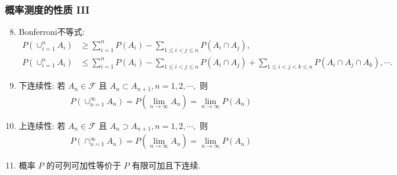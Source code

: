 \begin{frame}
	\frametitle{概率测度的性质 III}

	\begin{enumerate}[<+-|alert@+>]
		\setcounter{enumi}{7}
		\item Bonferroni不等式:
		{\small \begin{align*}
			P(\cup_{i=1}^{n} A_{i}) &\geq \sum_{i=1}^{n} P(A_{i})-\sum_{1\leq i<j\leq n} P(A_{i} \cap A_{j}), \\
			P(\cup_{i=1}^nA_i)&\leq \sum_{i=1}^{n} P(A_{i})-\sum_{1\leq i<j\leq n} P(A_{i} \cap A_{j})+\sum_{1\leq i<j<k\leq n}P(A_i\cap A_j\cap A_k), \cdots.
		\end{align*}}
		\item 下连续性:
		      若 $A_n\in\mathcal{F}$ 且 $A_n\subset A_{n+1}, n=1,2,\cdots,$ 则
		      \begin{eqnarray*}
			      P(\cup_{n=1}^\infty A_n)=P(\lim_{n\rightarrow\infty}A_n)=\lim_{n\rightarrow\infty}P(A_n)
		      \end{eqnarray*}
		\item 上连续性:
		      若 $A_n\in\mathcal{F}$ 且 $A_n\supset A_{n+1}, n=1,2,\cdots,$ 则
		      \begin{eqnarray*}
			      P(\cap_{n=1}^\infty A_n)=P(\lim_{n\rightarrow\infty}A_n)=\lim_{n\rightarrow\infty}P(A_n)
		      \end{eqnarray*}
		\item 概率 $P$ 的可列可加性等价于 $P$ 有限可加且下连续.
	\end{enumerate}

\end{frame}

